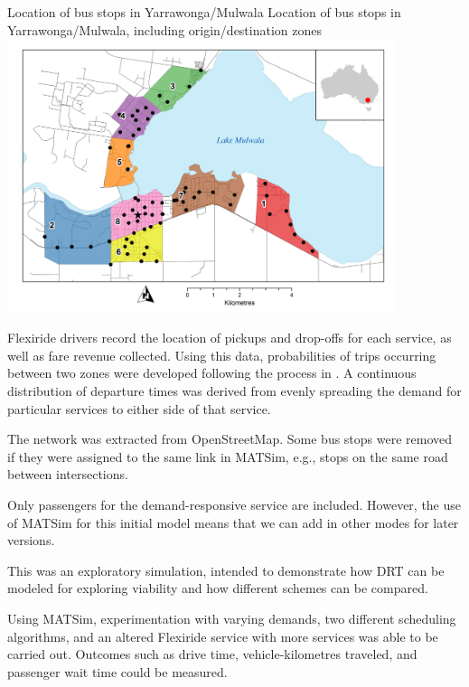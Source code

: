 \createfigure%
{Location of bus stops in Yarrawonga/Mulwala}%
{Location of bus stops in Yarrawonga/Mulwala, including origin/destination zones}%
{\label{fig:yarrawonga}}%
{\includegraphics[width=0.85\textwidth, angle=0]{./using/figures/yarrawonga_high.png}}%
{}



Flexiride drivers record the location of pickups and drop-offs for each service,
as well as fare revenue collected. Using this data, probabilities of trips
occurring between two zones were developed following the process in
\citep[][]{Deflorio_ITSIET_2011}. A continuous distribution of departure times was
derived from evenly spreading the demand for particular services to either side
of that service. 


The network was extracted from OpenStreetMap. Some bus stops were removed if
they were assigned to the same link in MATSim, e.g., stops on the same road
between intersections.

Only passengers for the demand-responsive service are included. However, the use
of MATSim for this initial model means that we can add in other modes for later
versions.


This was an exploratory simulation, intended to demonstrate how DRT can be
modeled for exploring viability and how different schemes can be compared.

Using MATSim, experimentation with varying demands, two different scheduling
algorithms, and an altered Flexiride service with more services was able to be
carried out. Outcomes such as drive time, vehicle-kilometres traveled, and
passenger wait time could be measured.

